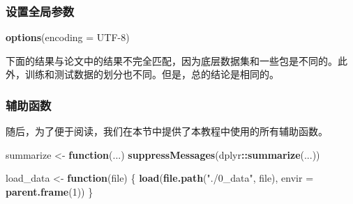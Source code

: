 \documentclass[
]{article}
\newenvironment{Shaded}{\begin{snugshade}}{\end{snugshade}}
\newcommand{\AttributeTok}[1]{\textcolor[rgb]{0.13,0.29,0.53}{#1}}
\newcommand{\CommentTok}[1]{\textcolor[rgb]{0.56,0.35,0.01}{\textit{#1}}}
\newcommand{\ControlFlowTok}[1]{\textcolor[rgb]{0.13,0.29,0.53}{\textbf{#1}}}
\newcommand{\DecValTok}[1]{\textcolor[rgb]{0.00,0.00,0.81}{#1}}
\newcommand{\FunctionTok}[1]{\textcolor[rgb]{0.13,0.29,0.53}{\textbf{#1}}}
\newcommand{\NormalTok}[1]{#1}
\newcommand{\OtherTok}[1]{\textcolor[rgb]{0.56,0.35,0.01}{#1}}
\newcommand{\SpecialCharTok}[1]{\textcolor[rgb]{0.81,0.36,0.00}{\textbf{#1}}}
\newcommand{\StringTok}[1]{\textcolor[rgb]{0.31,0.60,0.02}{#1}}
\begin{document}
\subsubsection{设置全局参数}\label{ux8bbeux7f6eux5168ux5c40ux53c2ux6570}

\begin{Shaded}
\begin{Highlighting}[]
\FunctionTok{options}\NormalTok{(}\AttributeTok{encoding =} \StringTok{\textquotesingle{}UTF{-}8\textquotesingle{}}\NormalTok{)}
\end{Highlighting}
\end{Shaded}

\begin{Shaded}
\end{Shaded}

下面的结果与论文中的结果不完全匹配，因为底层数据集和一些包是不同的。此外，训练和测试数据的划分也不同。但是，总的结论是相同的。

\subsubsection{辅助函数}\label{ux8f85ux52a9ux51fdux6570}

随后，为了便于阅读，我们在本节中提供了本教程中使用的所有辅助函数。

\begin{Shaded}
\begin{Highlighting}[]
\NormalTok{summarize }\OtherTok{\textless{}{-}} \ControlFlowTok{function}\NormalTok{(...) }\FunctionTok{suppressMessages}\NormalTok{(dplyr}\SpecialCharTok{::}\FunctionTok{summarize}\NormalTok{(...))}
\end{Highlighting}
\end{Shaded}

\begin{Shaded}
\begin{Highlighting}[]
\NormalTok{load\_data }\OtherTok{\textless{}{-}} \ControlFlowTok{function}\NormalTok{(file) \{}
  \FunctionTok{load}\NormalTok{(}\FunctionTok{file.path}\NormalTok{(}\StringTok{"./0\_data"}\NormalTok{, file), }\AttributeTok{envir =} \FunctionTok{parent.frame}\NormalTok{(}\DecValTok{1}\NormalTok{))}
\NormalTok{\}}
\end{Highlighting}
\end{Shaded}
\end{document}
